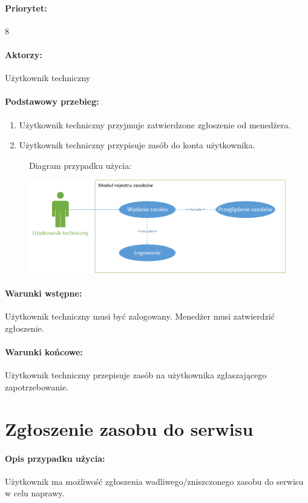 \documentclass[11pt, a4paper, oneside]{report}
\begin{document}
\paragraph{Priorytet:} 8
\paragraph{Aktorzy:} Użytkownik techniczny
\paragraph{Podstawowy przebieg:}
\begin{enumerate}
\item Użytkownik techniczny przyjmuje zatwierdzone zgłoszenie od menedżera.
\item Użytkownik techniczny przypisuje zasób do konta użytkownika.
\end{enumerate}

\begin{figure}[H]
Diagram przypadku użycia:

\centering
\includegraphics[scale=0.8]{wydanie_zasobu.png}
\end{figure}

\paragraph{Warunki wstępne:} Użytkownik techniczny musi być zalogowany. Menedżer musi zatwierdzić zgłoszenie.
\paragraph{Warunki końcowe:} Użytkownik techniczny przepisuje zasób na użytkownika zgłaszającego zapotrzebowanie.

\section{Zgłoszenie zasobu do serwisu}
\paragraph{Opis przypadku użycia:}
Użytkownik ma możliwość zgłoszenia wadliwego/zniszczonego zasobu do serwisu w celu naprawy.
\end{document}
